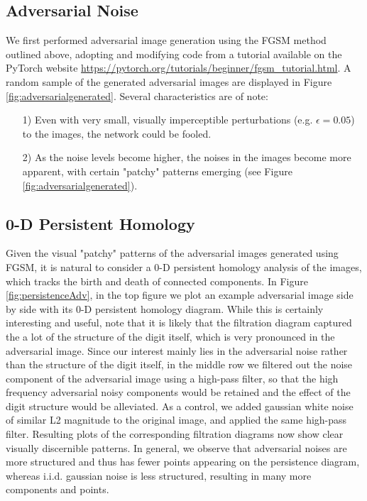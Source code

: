 \documentclass[twoside,twocolumn]{article}
\begin{document}
\subsection{Adversarial Noise}
We first performed adversarial image generation using the FGSM method outlined above, adopting and modifying code from a tutorial available on the PyTorch website \url{https://pytorch.org/tutorials/beginner/fgsm\_tutorial.html}. A random sample of the generated adversarial images are displayed in Figure \ref{fig:adversarialgenerated}. Several characteristics are of note: 
\begin{itemize}
    \item[1)] 
    Even with very small, visually imperceptible perturbations (e.g. $\epsilon = 0.05$) to the images, the network could be fooled. 
    \item[2)]
    As the noise levels become higher, the noises in the images become more apparent, with certain "patchy" patterns emerging (see Figure \ref{fig:adversarialgenerated}).   
\end{itemize}

\subsection{0-D Persistent Homology}

Given the visual "patchy" patterns of the adversarial images generated using FGSM, it is natural to consider a 0-D persistent homology analysis of the images, which tracks the birth and death of connected components. In Figure \ref{fig:persistenceAdv}, in the top figure we plot an example adversarial image side by side with its 0-D persistent homology diagram. While this is certainly interesting and useful, note that it is likely that the filtration diagram captured the a lot of the structure of the digit itself, which is very pronounced in the adversarial image. Since our interest mainly lies in the adversarial noise rather than the structure of the digit itself, in the middle row we filtered out the noise component of the adversarial image using a high-pass filter, so that the high frequency adversarial noisy components would be retained and the effect of the digit structure would be alleviated. As a control, we added gaussian white noise of similar L2 magnitude to the original image, and applied the same high-pass filter. Resulting plots of the corresponding filtration diagrams now show clear visually discernible patterns. In general, we observe that adversarial noises are more structured and thus has fewer points appearing on the persistence diagram, whereas i.i.d. gaussian noise is less structured, resulting in many more components and points. 
\end{document}
